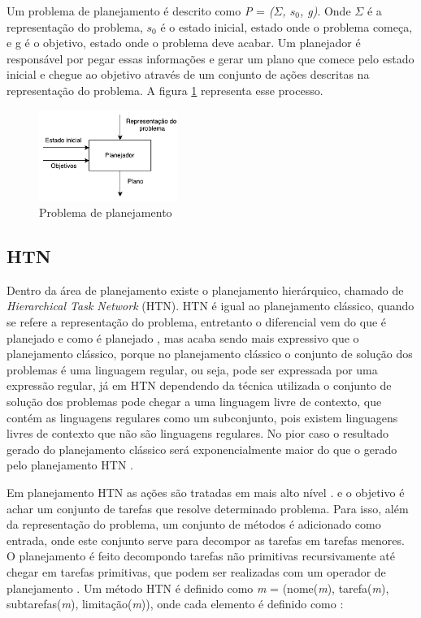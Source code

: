 Um problema de planejamento é descrito como \textit{P} = \textit{($\Sigma$, $s_{0}$, g)}. Onde $\Sigma$ é a representação do problema, $s_{0}$ é o estado inicial, estado onde o problema começa, e g é o objetivo, estado onde o problema deve acabar. Um planejador é responsável por pegar essas informações e gerar um plano que comece pelo estado inicial e chegue ao objetivo através de um conjunto de ações descritas na representação do problema. A figura \ref{fig:planmodelo} representa esse processo.

\begin{figure}[ht]
	\centering
	\includegraphics[width=0.4\textwidth]{fig/modelo.pdf}
	\caption{Problema de planejamento}
	\label{fig:planmodelo}
\end{figure} 


\subsection{HTN} 

Dentro da área de planejamento existe o planejamento hierárquico, chamado de \textit{Hierarchical Task Network} (HTN). HTN é igual ao planejamento clássico, quando se refere a representação do problema, entretanto o diferencial vem do que é planejado e como é planejado \cite{ghallab2004automated}, mas acaba sendo mais expressivo que o planejamento clássico, porque no planejamento clássico o conjunto de solução dos problemas é uma linguagem regular, ou seja, pode ser expressada por uma expressão regular, já em HTN dependendo da técnica utilizada o conjunto de solução dos problemas pode chegar a uma linguagem livre de contexto, que contém as linguagens regulares como um subconjunto, pois existem linguagens livres de contexto que não são linguagens regulares. No pior caso o resultado gerado do planejamento clássico será exponencialmente maior do que o gerado pelo planejamento HTN \cite{ghallab2004automated}.  

Em planejamento HTN as ações são tratadas em mais alto nível \cite{intelligence2003modern}. e o objetivo é achar um conjunto de tarefas que resolve determinado problema. Para isso, além da representação do problema, um conjunto de métodos é adicionado como entrada, onde este conjunto serve para decompor as tarefas em tarefas menores. O planejamento é feito decompondo tarefas não primitivas recursivamente até chegar em tarefas primitivas, que podem ser realizadas com um operador de planejamento \cite{ghallab2004automated}. Um método HTN é definido como \textit{m} = (nome(\textit{m}), tarefa(\textit{m}), subtarefas(\textit{m}), limitação(\textit{m})), onde cada elemento é definido como \cite{ghallab2004automated}: 
 
